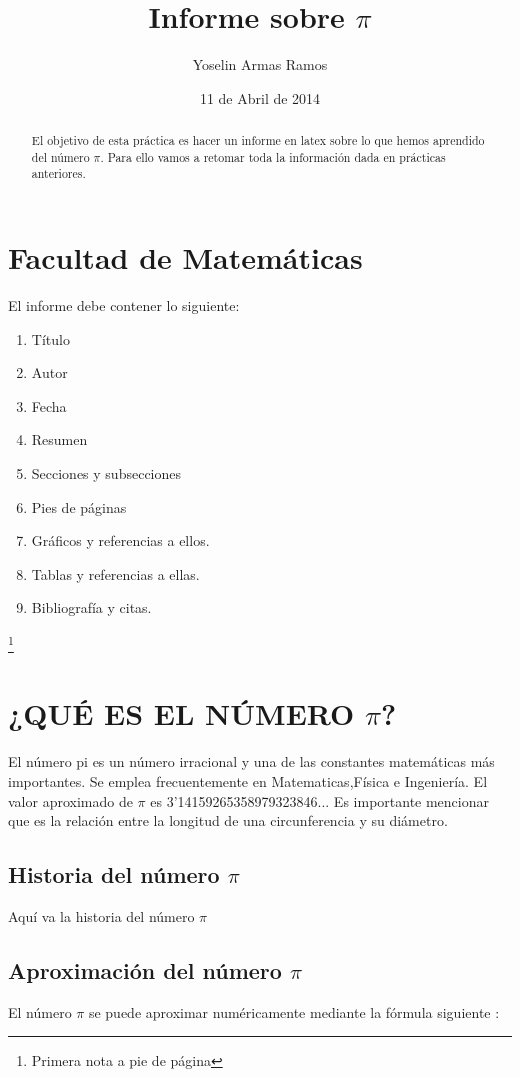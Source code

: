 \documentclass [12pt,a4paper]{article}  %
\begin{document}
\title {Informe sobre $\pi$} %
\author{Yoselin Armas Ramos} %
\date{ 11 de Abril de 2014} %
\maketitle
\begin{abstract}
El objetivo de esta práctica es hacer un informe en latex sobre lo que hemos aprendido del número $\pi$.
Para ello vamos a retomar toda la información dada en prácticas anteriores.
\end{abstract} 
\section{Facultad de Matemáticas} 
El informe debe contener lo siguiente: 
\begin{enumerate}
\item Título
\item Autor
\item Fecha
\item Resumen
\item Secciones y subsecciones
\item Pies de páginas
\item Gráficos y referencias a ellos.
\item Tablas y referencias a ellas.
\item Bibliografía y citas.
\end{enumerate}

\footnote{Primera nota a pie de página }

\section{¿QUÉ ES EL NÚMERO $\pi$?} %
El número pi es un número irracional y una de las constantes matemáticas más importantes. 
Se emplea frecuentemente en Matematicas,Física e Ingeniería. El valor aproximado de $\pi$ es 3'14159265358979323846...
Es importante mencionar que es la relación entre la longitud de una circunferencia y su diámetro.
\subsection{Historia del número  $\pi$ }
 Aquí va la historia del número $\pi$  
\subsection{ Aproximación del número $\pi$} %
El número $\pi$ se puede aproximar numéricamente mediante la fórmula siguiente :
\end{document}
